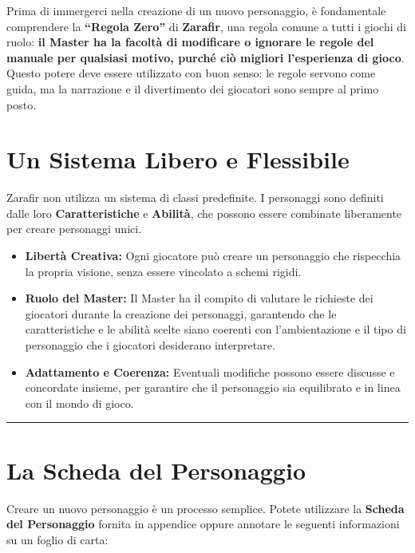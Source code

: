\documentclass[../manuale_main.tex]{subfiles}
\begin{document}
Prima di immergerci nella creazione di un nuovo personaggio, è fondamentale comprendere la \textbf{“Regola Zero”} di \textbf{Zarafir}, una regola comune a tutti i giochi di ruolo: \textbf{il Master ha la facoltà di modificare o ignorare le regole del manuale per qualsiasi motivo, purché ciò migliori l’esperienza di gioco}. Questo potere deve essere utilizzato con buon senso: le regole servono come guida, ma la narrazione e il divertimento dei giocatori sono sempre al primo posto.

\vspace{0.3cm}

\section{Un Sistema Libero e Flessibile}
Zarafir non utilizza un sistema di classi predefinite. I personaggi sono definiti dalle loro \textbf{Caratteristiche} e \textbf{Abilità}, che possono essere combinate liberamente per creare personaggi unici. 

\begin{itemize}
    \item \textbf{Libertà Creativa:} Ogni giocatore può creare un personaggio che rispecchia la propria visione, senza essere vincolato a schemi rigidi.
    \item \textbf{Ruolo del Master:} Il Master ha il compito di valutare le richieste dei giocatori durante la creazione dei personaggi, garantendo che le caratteristiche e le abilità scelte siano coerenti con l’ambientazione e il tipo di personaggio che i giocatori desiderano interpretare.
    \item \textbf{Adattamento e Coerenza:} Eventuali modifiche possono essere discusse e concordate insieme, per garantire che il personaggio sia equilibrato e in linea con il mondo di gioco.
\end{itemize}

\vspace{0.5cm}
\noindent
\begin{center}
\rule{\textwidth}{0.4pt} 
\end{center}
\vspace{0.5cm}

\section{La Scheda del Personaggio}
Creare un nuovo personaggio è un processo semplice. Potete utilizzare la \textbf{Scheda del Personaggio} fornita in appendice oppure annotare le seguenti informazioni su un foglio di carta:
\end{document}
